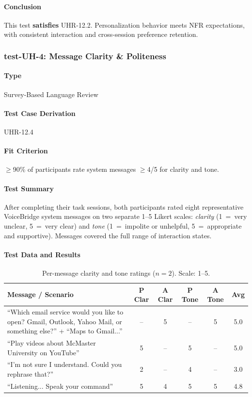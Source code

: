 \documentclass[12pt, titlepage]{article}
\begin{document}
\paragraph{Conclusion}
This test \textbf{satisfies} UHR-12.2. Personalization behavior meets NFR expectations, with consistent interaction and cross-session preference retention.

\subsubsection{test-UH-4: Message Clarity \& Politeness}

\paragraph{Type} Survey-Based Language Review

\paragraph{Test Case Derivation} UHR-12.4

\paragraph{Fit Criterion}
$\geq$90\% of participants rate system messages $\geq$4/5 for clarity
and tone.

\paragraph{Test Summary}
After completing their task sessions, both participants rated eight
representative VoiceBridge system messages on two separate 1--5 Likert
scales: \emph{clarity} (1~=~very unclear, 5~=~very clear) and \emph{tone}
(1~=~impolite or unhelpful, 5~=~appropriate and supportive). Messages covered
the full range of interaction states.

\paragraph{Test Data and Results}

\begin{table}[H]
\centering
\caption{Per-message clarity and tone ratings ($n=2$). Scale: 1--5.}
\begin{tabular}{|p{6cm}|c|c|c|c|c|}
\hline
\textbf{Message / Scenario} & \textbf{P Clar} & \textbf{A Clar} & \textbf{P Tone} & \textbf{A Tone} & \textbf{Avg} \\ \hline
``Which email service would you like to open? Gmail, Outlook, Yahoo Mail, or something else?'' + ``Maps to Gmail...'' & -- & 5 & -- & 5 & 5.0 \\ \hline
``Play videos about McMaster University on YouTube'' & 5 & -- & 5 & -- & 5.0 \\ \hline
``I'm not sure I understand. Could you rephrase that?'' & 2 & -- & 4 & -- & 3.0 \\ \hline
``Listening... Speak your command'' & 5 & 4 & 5 & 5 & 4.8 \\ \hline
\end{tabular}
\end{table}
\end{document}
